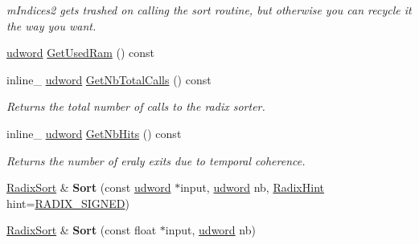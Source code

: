 \begin{DoxyCompactItemize}
\begin{DoxyCompactList}\small\item\em m\+Indices2 gets trashed on calling the sort routine, but otherwise you can recycle it the way you want. \end{DoxyCompactList}\item 
\hyperlink{_ice_types_8h_a44c6f1920ba5551225fb534f9d1a1733}{udword} \hyperlink{class_radix_sort_afc66aa956bc2e5078697d75436f9553b}{Get\+Used\+Ram} () const 
\item 
\hypertarget{class_radix_sort_a3872636cd420e073d23b247bc00fa818}{inline\+\_\+ \hyperlink{_ice_types_8h_a44c6f1920ba5551225fb534f9d1a1733}{udword} \hyperlink{class_radix_sort_a3872636cd420e073d23b247bc00fa818}{Get\+Nb\+Total\+Calls} () const }\label{class_radix_sort_a3872636cd420e073d23b247bc00fa818}

\begin{DoxyCompactList}\small\item\em Returns the total number of calls to the radix sorter. \end{DoxyCompactList}\item 
\hypertarget{class_radix_sort_ac69a0a1cc27abac0bd986233dd5fc12a}{inline\+\_\+ \hyperlink{_ice_types_8h_a44c6f1920ba5551225fb534f9d1a1733}{udword} \hyperlink{class_radix_sort_ac69a0a1cc27abac0bd986233dd5fc12a}{Get\+Nb\+Hits} () const }\label{class_radix_sort_ac69a0a1cc27abac0bd986233dd5fc12a}

\begin{DoxyCompactList}\small\item\em Returns the number of eraly exits due to temporal coherence. \end{DoxyCompactList}\item 
\hypertarget{class_radix_sort_a0fb46275af47eee8eb623dda8a978a07}{\hyperlink{class_radix_sort}{Radix\+Sort} \& {\bfseries Sort} (const \hyperlink{_ice_types_8h_a44c6f1920ba5551225fb534f9d1a1733}{udword} $\ast$input, \hyperlink{_ice_types_8h_a44c6f1920ba5551225fb534f9d1a1733}{udword} nb, \hyperlink{_ice_revisited_radix_8h_acf223d4d688c445c2088d9b2d9aee8d0}{Radix\+Hint} hint=\hyperlink{_ice_revisited_radix_8h_acf223d4d688c445c2088d9b2d9aee8d0a91fa3afcca04aadade3caad8b46d511b}{R\+A\+D\+I\+X\+\_\+\+S\+I\+G\+N\+E\+D})}\label{class_radix_sort_a0fb46275af47eee8eb623dda8a978a07}

\item 
\hypertarget{class_radix_sort_a94383bb596afb1eef767257e839de6b9}{\hyperlink{class_radix_sort}{Radix\+Sort} \& {\bfseries Sort} (const float $\ast$input, \hyperlink{_ice_types_8h_a44c6f1920ba5551225fb534f9d1a1733}{udword} nb)}\label{class_radix_sort_a94383bb596afb1eef767257e839de6b9}


\end{DoxyCompactItemize}
